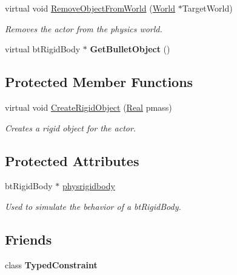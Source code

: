\begin{DoxyCompactItemize}
virtual void \hyperlink{classphys_1_1ActorRigid_a7101df2a149e0ccb3678b7c2c00998f8}{RemoveObjectFromWorld} (\hyperlink{classphys_1_1World}{World} $\ast$TargetWorld)
\begin{DoxyCompactList}\small\item\em Removes the actor from the physics world. \item\end{DoxyCompactList}\item 
\hypertarget{classphys_1_1ActorRigid_a9c8f1f4b99f41ab97050f5b15c802f14}{
virtual btRigidBody $\ast$ {\bfseries GetBulletObject} ()}
\label{d8/d71/classphys_1_1ActorRigid_a9c8f1f4b99f41ab97050f5b15c802f14}

\end{DoxyCompactItemize}
\subsection*{Protected Member Functions}
\begin{DoxyCompactItemize}
\item 
virtual void \hyperlink{classphys_1_1ActorRigid_a19227c52b972cd96ad69a7b6273e2bbf}{CreateRigidObject} (\hyperlink{namespacephys_af7eb897198d265b8e868f45240230d5f}{Real} pmass)
\begin{DoxyCompactList}\small\item\em Creates a rigid object for the actor. \item\end{DoxyCompactList}\end{DoxyCompactItemize}
\subsection*{Protected Attributes}
\begin{DoxyCompactItemize}
\item 
\hypertarget{classphys_1_1ActorRigid_a690889f942e177644f4f8521f509c88d}{
btRigidBody $\ast$ \hyperlink{classphys_1_1ActorRigid_a690889f942e177644f4f8521f509c88d}{physrigidbody}}
\label{d8/d71/classphys_1_1ActorRigid_a690889f942e177644f4f8521f509c88d}

\begin{DoxyCompactList}\small\item\em Used to simulate the behavior of a btRigidBody. \item\end{DoxyCompactList}\end{DoxyCompactItemize}
\subsection*{Friends}
\begin{DoxyCompactItemize}
\item 
\hypertarget{classphys_1_1ActorRigid_aefa96202ca25d6b82320520f2789b6cf}{
class {\bfseries TypedConstraint}}
\label{d8/d71/classphys_1_1ActorRigid_aefa96202ca25d6b82320520f2789b6cf}

\end{DoxyCompactItemize}


